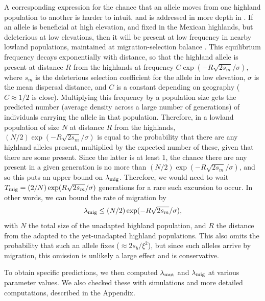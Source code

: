 A corresponding expression for the chance that an allele moves from one highland population to another is harder to intuit,
and is addressed in more depth in \citep{ralphcoop2013patches}.
If an allele is beneficial at high elevation, and fixed in the Mexican highlands,
but deleterious at low elevations,
then it will be present at low frequency in nearby lowland populations,
maintained at migration-selection balance \citep{slatkin1973geneflow}.
This equilibrium frequency decays exponentially with distance,
so that the highland allele is present at distance $R$ from the highlands at frequency $C \exp(- R \sqrt{2s_m} / \sigma)$,
where $s_m$ is the deleterious selection coefficient for the allele in low elevation,
$\sigma$ is the mean dispersal distance,
and $C$ is a constant depending on geography ($C\approx 1/2$ is close).
Multiplying this frequency by a population size gets the predicted number (average density across a large number of generations) of individuals carrying the allele in that population.
Therefore, in a lowland population of size $N$ at distance $R$ from the highlands,
$(N/2)  \exp(- R \sqrt{2s_m} / \sigma)$ is equal to the probability that there are any highland alleles present,
multiplied by the expected number of these, given that there are some present.
Since the latter is at least 1,
the chance there are any present in a given generation is no more than $(N/2) \exp(- R \sqrt{2s_m} / \sigma)$,
and so this puts an upper bound on $\lambda_{\text{mig}}$.
Therefore, we would need to wait $T_{\text{mig}} = (2/N)\exp(R \sqrt{2s_m} / \sigma)$ generations 
for a rare such excursion to occur.
In other words, we can bound the rate of migration by
\begin{align}
  \lambda_{\text{mig}} \le (N/2)  \exp(- R \sqrt{2s_m} / \sigma) ,
\end{align}
with $N$ the total size of the unadapted highland population,
and $R$ the distance from the adapted to the yet-unadapted highland populations.
This also omits the probability that such an allele fixes ($\approx 2s_b/\xi^2$), 
but since such alleles arrive by migration, this omission is unlikely a large effect and is conservative.

To obtain specific predictions,
we then computed $\lambda_{\text{mut}}$ and $\lambda_{\text{mig}}$ at various parameter values.
We also checked these with simulations and more detailed computations,
described in the Appendix.
